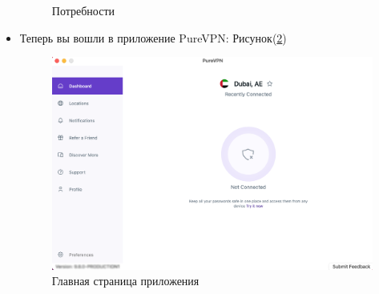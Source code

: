 \begin{itemize}
\begin{figure}[H]
\centering
\caption{Потребности}
\label{fig:32}
\end{figure}
\item Теперь вы вошли в приложение PureVPN:  Рисунок(\ref{fig:33})
\begin{figure}[H]
\includegraphics[width=14cm]{28.png}
\centering
\caption{Главная страница приложения}
\label{fig:33}
\end{figure}
\end{itemize}

